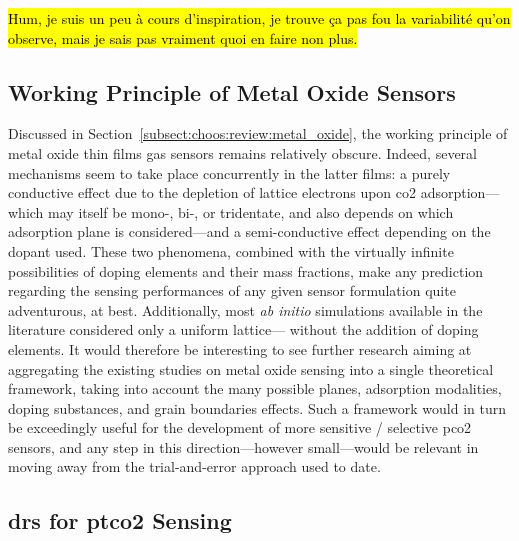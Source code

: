 \hl{Hum, je suis un peu à cours d'inspiration, je trouve ça pas fou la variabilité qu'on observe, mais je sais pas vraiment quoi en faire non plus.}

\subsection{Working Principle of Metal Oxide Sensors}

Discussed in Section~\ref{subsect:choos:review:metal_oxide}, the working principle of metal oxide thin films gas sensors remains relatively obscure. Indeed, several mechanisms seem to take place concurrently in the latter films: a purely conductive effect due to the depletion of lattice electrons upon \gls{co2} adsorption---which may itself be mono-, bi-, or tridentate\cite{usseinov2019}, and also depends on which adsorption plane is considered\cite{tang2013}---and a semi-conductive effect depending on the dopant used\cite{niu2004, sato2007, ra2010}. These two phenomena, combined with the virtually infinite possibilities of doping elements and their mass fractions, make any prediction regarding the sensing performances of any given sensor formulation quite adventurous, at best. Additionally, most \textit{ab initio} simulations available in the literature considered only a uniform lattice---\ie{} without the addition of doping elements. It would therefore be interesting to see further research aiming at aggregating the existing studies on metal oxide sensing into a single theoretical framework, taking into account the many possible planes, adsorption modalities, doping substances, and grain boundaries effects. Such a framework would in turn be exceedingly useful for the development of more sensitive / selective \gls{pco2} sensors, and any step in this direction---however small---would be relevant in moving away from the trial-and-error approach used to date.

\subsection{\texorpdfstring{\gls{drs} for \gls{ptco2} Sensing}{DRS for tcpCO2 Sensing}}

